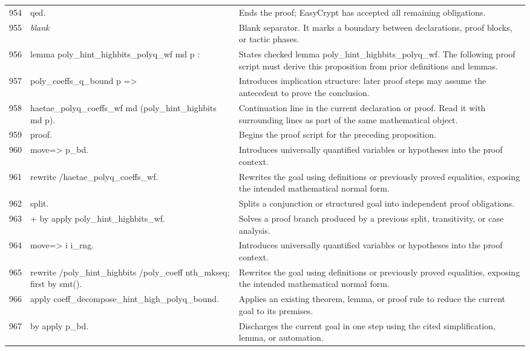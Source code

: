 \documentclass[10pt]{article}
\begin{document}
\begin{longtable}{r L{0.53\textwidth} L{0.37\textwidth}}
954 & {\ttfamily\scriptsize qed.} & Ends the proof; EasyCrypt has accepted all remaining obligations. \\
955 & {\ttfamily\scriptsize \emph{blank}} & Blank separator.  It marks a boundary between declarations, proof blocks, or tactic phases. \\
956 & {\ttfamily\scriptsize lemma poly\_hint\_highbits\_polyq\_wf md p :} & States checked lemma poly\_hint\_highbits\_polyq\_wf.  The following proof script must derive this proposition from prior definitions and lemmas. \\
957 & {\ttfamily\scriptsize   poly\_coeffs\_q\_bound p =>} & Introduces implication structure: later proof steps may assume the antecedent to prove the conclusion. \\
958 & {\ttfamily\scriptsize   haetae\_polyq\_coeffs\_wf md (poly\_hint\_highbits md p).} & Continuation line in the current declaration or proof.  Read it with surrounding lines as part of the same mathematical object. \\
959 & {\ttfamily\scriptsize proof.} & Begins the proof script for the preceding proposition. \\
960 & {\ttfamily\scriptsize move=> p\_bd.} & Introduces universally quantified variables or hypotheses into the proof context. \\
961 & {\ttfamily\scriptsize rewrite /haetae\_polyq\_coeffs\_wf.} & Rewrites the goal using definitions or previously proved equalities, exposing the intended mathematical normal form. \\
962 & {\ttfamily\scriptsize split.} & Splits a conjunction or structured goal into independent proof obligations. \\
963 & {\ttfamily\scriptsize + by apply poly\_hint\_highbits\_wf.} & Solves a proof branch produced by a previous split, transitivity, or case analysis. \\
964 & {\ttfamily\scriptsize move=> i i\_rng.} & Introduces universally quantified variables or hypotheses into the proof context. \\
965 & {\ttfamily\scriptsize rewrite /poly\_hint\_highbits /poly\_coeff nth\_mkseq; first by smt().} & Rewrites the goal using definitions or previously proved equalities, exposing the intended mathematical normal form. \\
966 & {\ttfamily\scriptsize apply coeff\_decompose\_hint\_high\_polyq\_bound.} & Applies an existing theorem, lemma, or proof rule to reduce the current goal to its premises. \\
967 & {\ttfamily\scriptsize by apply p\_bd.} & Discharges the current goal in one step using the cited simplification, lemma, or automation. \\

\end{longtable}
\end{document}
